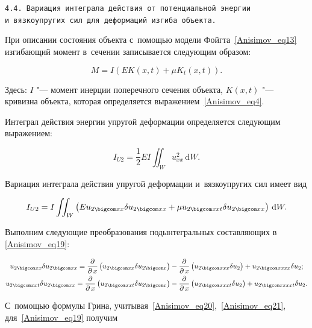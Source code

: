 \smallskip



{\tt 4.4. Вариация интеграла действия от~потенциальной энер\-гии и~вязко\-упругих сил для~деформаций изгиба объекта.} 

При описании состояния объекта с~помощью модели Фойгта~\eqref{Anisimov_eq13} изгибающий момент в~сечении записывается следующим образом: 

$$M=I\left(EK( x,  t )+\mu K_t( x,  t )\right).$$ 

Здесь: $I$ "---  момент инерции поперечного сечения  объекта, $K( x,  t )$ "---  кривизна объекта, которая определяется выражением~\eqref{Anisimov_eq4}. 

Интеграл действия энергии упругой деформации определяется следующим выражением:

\begin{equation}\nonumber

I_{U2}=\frac12EI\iint_{W}u^2_{xx}\,\mathrm{d}W.

\end{equation}

Вариация интеграла действия упругой деформации и~вязкоупругих сил имеет вид

\begin{equation}\label{Anisimov_eq19}

I_{U2}=I\iint_{W}\left(Eu_{2 \bigcom xx}\delta u_{2 \bigcom xx}+\mu u_{2 \bigcom xxt}\delta u_{2 \bigcom xx}\right)\,\mathrm{d}W.

\end{equation}

Выполним следующие преобразования подынтегральных составляющих в \eqref{Anisimov_eq19}:

\begin{gather}

u_{2 \bigcom xx}\delta u_{2 \bigcom xx}=\frac{\partial}{\partial\,x}\left(u_{2 \bigcom xx}\delta u_{2 \bigcom x}\right)- \frac{\partial}{\partial\,x}\left(u_{2 \bigcom xxx}\delta u_2\right)+u_{2 \bigcom xxxx}\delta u_2; \label{Anisimov_eq20}\\

u_{2 \bigcom xxt}\delta u_{2 \bigcom xx}=\frac{\partial}{\partial\,x}\left(u_{2 \bigcom xxt}\delta u_{2 \bigcom x}\right)- \frac{\partial}{\partial\,x}\left(u_{2 \bigcom xxxt}\delta u_2\right)+u_{2 \bigcom xxxxt}\delta u_2.\label{Anisimov_eq21}

\end{gather}

С~помощью формулы Грина, учитывая~\eqref{Anisimov_eq20},~\eqref{Anisimov_eq21}, для~\eqref{Anisimov_eq19} получим

